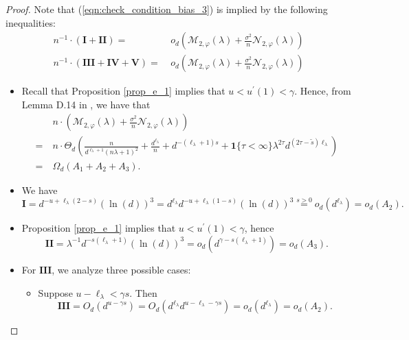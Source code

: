 \documentclass{article}
\theoremstyle{plain}
\theoremstyle{definition}
\theoremstyle{remark}
\newcommand{\calN}{\mathcal{N}}
\begin{document}
\begin{appendix}
\begin{proof}
Note that (\ref{eqn:check_condition_bias_3}) is implied by the following inequalities:
\begin{equation*}
    \begin{aligned}
        n^{-1} \cdot \left(\mathbf{I} + \mathbf{II}\right) =&~ o_{d}\left( \mathcal{M}_{2, \varphi}(\lambda) + \frac{\sigma^2}{n} \calN_{2,\varphi}(\lambda)  \right)\\
        n^{-1}
    \cdot \left(\mathbf{III} + \mathbf{IV} + \mathbf{V}\right) =&~ o_{d}\left( \mathcal{M}_{2, \varphi}(\lambda) + \frac{\sigma^2}{n} \calN_{2,\varphi}(\lambda)  \right)
    \end{aligned}
\end{equation*}




\begin{itemize}
    \item Recall that Proposition \ref{prop_e_1} implies that $u < u^{\prime}(1) < \gamma$. Hence, from Lemma D.14 in \cite{lu2024saturation}, we have that 
        \begin{align*}
           &~ n \cdot \left(\mathcal{M}_{2, \varphi}(\lambda) +  \frac{\sigma^2}{n}\mathcal{N}_{2, \varphi}(\lambda)\right)\\
           = &~
    n \cdot \Theta_{d} \left( \frac{n}{d^{\ell_{\lambda}+1}(n\lambda+1)^{2}} + \frac{d^{\ell_{\lambda}}}{n} + 
    d^{-(\ell_{\lambda}+1)s}
    +\mathbf{1}\{\tau<\infty\}\lambda^{2\tau}d^{(2\tau-\tilde{s})\ell_{\lambda} }\right)\\
    = &~ \Omega_d (A_1 + A_2 + A_3).
        \end{align*}
    
    \item We have
    $$
    \mathbf{I} = d^{-u + \ell_{\lambda}(2-s)} (\ln(d))^3 = d^{\ell_{\lambda}} d^{-u + \ell_{\lambda}(1-s)} (\ln(d))^3 \overset{s>0}{=} o_d( d^{\ell_{\lambda}})=o_d(A_2).
    $$
    \item Proposition \ref{prop_e_1} implies that $u < u^{\prime}(1) < \gamma$, hence
    $$
    \mathbf{II}=\lambda^{-1}d^{-s(\ell_{\lambda}+1)}(\ln(d))^3 = o_d( d^{\gamma-s(\ell_{\lambda}+1)} )=o_d(A_3).
    $$

    \item For $\mathbf{III}$, we analyze three possible cases:
    \begin{itemize}
        \item Suppose $u-\ell_{\lambda} < \gamma s$. Then
        $$
            \mathbf{III} = O_d(d^{u-\gamma s}) = O_d(d^{\ell_{\lambda}}d^{u-\ell_{\lambda}-\gamma s}) = o_d(d^{\ell_{\lambda}})=o_d(A_2).
        $$


\end{itemize}
\end{itemize}
\end{proof}
\end{appendix}
\end{document}
